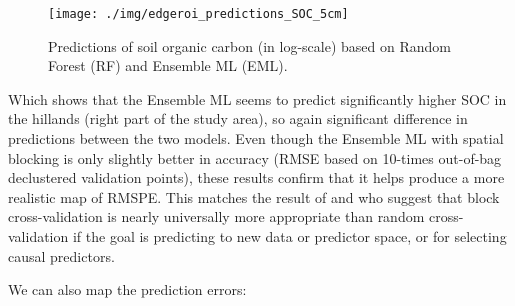 \documentclass[
  graybox,natbib,nospthms]{svmono}
\begin{document}
\begin{figure}

{\centering \texttt{[image: ./img/edgeroi\_predictions\_SOC\_5cm]} 

}

\caption{Predictions of soil organic carbon (in log-scale) based on Random Forest (RF) and Ensemble ML (EML).}\label{fig:pred-soc}
\end{figure}

Which shows that the Ensemble ML seems to predict significantly higher SOC in the
hillands (right part of the study area), so again significant difference in predictions
between the two models. Even though the Ensemble ML with spatial blocking is only
slightly better in accuracy (RMSE based on 10-times out-of-bag declustered validation points),
these results confirm that it helps produce a more realistic map of RMSPE.
This matches the result of \citet{roberts2017cross} and \citet{meyer2018improving} who suggest that block cross-validation is
nearly universally more appropriate than random cross-validation if the goal is
predicting to new data or predictor space, or for selecting causal predictors.

We can also map the prediction errors:
\end{document}
